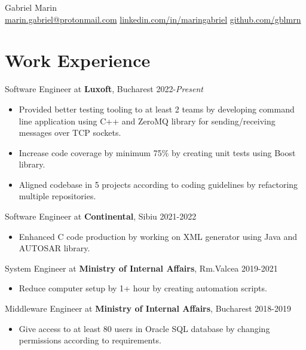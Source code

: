 \documentclass[a4paper,12pt]{article}
\begin{document}
\pagestyle{empty}

\begin{center}
\par {
  {\Huge Gabriel Marin}\\
}
\href{mailto:marin.gabriel@protonmail.com}{marin.gabriel@protonmail.com} \vrule\vspace{3mm}
\href{https://linkedin.com/in/maringabriel}{linkedin.com/in/maringabriel} \vrule\vspace{3mm}
\href{https://github.com/gblmrn}{github.com/gblmrn}
\end{center}

\section{Work Experience}
Software Engineer at \textbf{Luxoft}, Bucharest \hfill 2022-\emph{Present}
\vspace{-3mm}
\begin{itemize}[noitemsep, leftmargin=4mm]
\item Provided better testing tooling to at least 2 teams by developing command line application using C++ and ZeroMQ library for sending/receiving messages over TCP sockets.
\item Increase code coverage by minimum 75\% by creating unit tests using Boost library.
\item Aligned codebase in 5 projects according to coding guidelines by refactoring multiple repositories.
\end{itemize}
  
Software Engineer at \textbf{Continental}, Sibiu \hfill 2021-2022
\vspace{-3mm}
\begin{itemize}[noitemsep, leftmargin=4mm]
\item Enhanced C code production by working on XML generator using Java and AUTOSAR library.
\end{itemize}
  
System Engineer at \textbf{Ministry of Internal Affairs}, Rm.Valcea \hfill 2019-2021
\vspace{-3mm}
\begin{itemize}[noitemsep, leftmargin=4mm]
\item Reduce computer setup by 1+ hour by creating automation scripts.
\end{itemize}
  
Middleware Engineer at \textbf{Ministry of Internal Affairs}, Bucharest \hfill 2018-2019
\vspace{-3mm}
\begin{itemize}[noitemsep, leftmargin=4mm]
\item Give access to at least 80 users in Oracle SQL database by changing permissions according to requirements.
\end{itemize}
\end{document}
